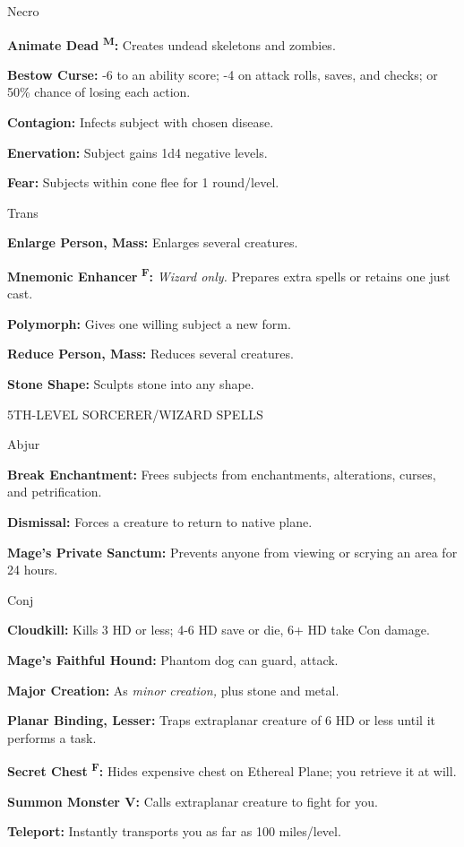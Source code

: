 \documentclass{article}
\begin{document}
Necro

\textbf{Animate Dead }\textsuperscript{\textbf{M}}\textbf{:} Creates undead skeletons 
and zombies.

\textbf{Bestow Curse:} -6 to an ability score; -4 on attack rolls, saves, and checks; 
or 50\% chance of losing each action.

\textbf{Contagion:} Infects subject with chosen disease.

\textbf{Enervation:} Subject gains 1d4 negative levels.

\textbf{Fear:} Subjects within cone flee for 1 round/level.

Trans

\textbf{Enlarge Person, Mass:} Enlarges several creatures.

\textbf{Mnemonic Enhancer }\textsuperscript{\textbf{F}}\textbf{:} \textit{Wizard 
only. }Prepares extra spells or retains one just cast.

\textbf{Polymorph:} Gives one willing subject a new form.

\textbf{Reduce Person, Mass:} Reduces several creatures.

\textbf{Stone Shape:} Sculpts stone into any shape.

5TH-LEVEL SORCERER/WIZARD SPELLS

Abjur

\textbf{Break Enchantment:} Frees subjects from enchantments, alterations, curses, 
and petrification.

\textbf{Dismissal:} Forces a creature to return to native plane.

\textbf{Mage's Private Sanctum:} Prevents anyone from viewing or scrying an area 
for 24 hours.

Conj

\textbf{Cloudkill:} Kills 3 HD or less; 4-6 HD save or die, 6+ HD take Con damage.

\textbf{Mage's Faithful Hound:} Phantom dog can guard, attack.

\textbf{Major Creation:} As \textit{minor creation, }plus stone and metal.

\textbf{Planar Binding, Lesser:} Traps extraplanar creature of 6 HD or less until 
it performs a task.

\textbf{Secret Chest }\textsuperscript{\textbf{F}}\textbf{:} Hides expensive chest 
on Ethereal Plane; you retrieve it at will.

\textbf{Summon Monster V:} Calls extraplanar creature to fight for you.

\textbf{Teleport:} Instantly transports you as far as 100 miles/level.
\end{document}
